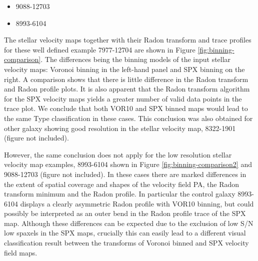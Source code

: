 \begin{itemize}
    \item 9088-12703
    \item 8993-6104
\end{itemize}

The stellar velocity maps together with their Radon transform and trace profiles for these well defined example 7977-12704 are shown in Figure \ref{fig:binning-comparison}. The differences being the binning models of the input stellar velocity maps: Voronoi binning in the left-hand panel and SPX binning on the right. A comparison shows that there is little difference in the Radon transform and Radon profile plots. It is also apparent that the Radon transform algorithm for the SPX velocity maps yields a greater number of valid data points in the trace plot. We conclude that both VOR10 and SPX binned maps would lead to the same Type classification in these cases. This conclusion was also obtained for other galaxy showing good resolution in the stellar velocity map,  8322-1901 (figure not included). 

However, the same conclusion does not apply for the low resolution stellar velocity map examples, 8993-6104 shown in Figure \ref{fig:binning-comparison2} and 9088-12703 (figure not included). In these cases there are marked differences in the extent of spatial coverage and shapes of the velocity field PA, the Radon transform minimum and the Radon profile. In particular the control galaxy 8993-6104 displays a clearly asymmetric Radon profile with VOR10 binning, but could possibly be interpreted as an outer bend in the Radon profile trace of the SPX map. Although these differences can be expected due to the exclusion of low S/N low spaxels in the SPX maps, crucially this can easily lead to a different visual classification result between the transforms of Voronoi binned and SPX velocity field maps. 

